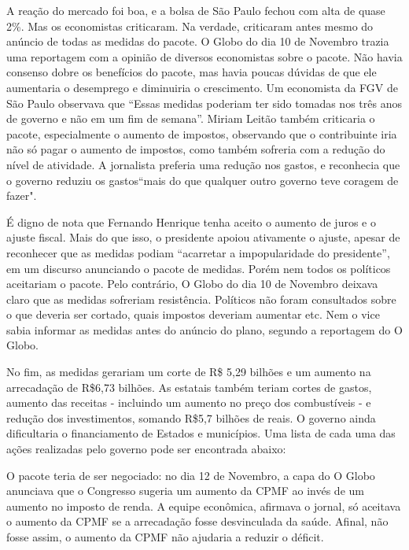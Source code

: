 \documentclass{article}
\begin{document}
A reação do mercado foi boa, e a bolsa de São Paulo fechou com alta de quase 2\%. Mas os economistas criticaram. Na verdade, criticaram antes mesmo do anúncio de todas as medidas do pacote. O Globo do dia 10 de Novembro trazia uma reportagem com a opinião de diversos economistas sobre o pacote. Não havia consenso dobre os benefícios do pacote, mas havia poucas dúvidas de que ele aumentaria o desemprego e diminuiria o crescimento. Um economista da FGV de São Paulo observava que ``Essas medidas poderiam ter sido tomadas nos três anos de governo e não em um fim de semana''. Miriam Leitão também criticaria o pacote, especialmente o aumento de impostos, observando que o contribuinte iria não só pagar o aumento de impostos, como também sofreria com a redução do nível de atividade. A jornalista preferia uma redução nos gastos, e reconhecia que o governo reduziu os gastos``mais do que qualquer outro governo teve coragem de fazer". 

É digno de nota que Fernando Henrique tenha aceito o aumento de juros e o ajuste fiscal. Mais do que isso, o presidente apoiou ativamente o ajuste, apesar de reconhecer que as medidas podiam ``acarretar a impopularidade do presidente'', em um discurso anunciando o pacote de medidas. Porém nem todos os políticos aceitariam o pacote. Pelo contrário, O Globo do dia 10 de Novembro deixava claro que as medidas sofreriam resistência. Políticos não foram consultados sobre o que deveria ser cortado, quais impostos deveriam aumentar etc. Nem o vice sabia informar as medidas antes do anúncio do plano, segundo a reportagem do O Globo. 

No fim, as medidas gerariam um corte de R\$ 5,29 bilhões e um aumento na arrecadação de R\$6,73 bilhões. As estatais também teriam cortes de gastos, aumento das receitas - incluindo um aumento no preço dos combustíveis - e redução dos investimentos, somando R\$5,7 bilhões de reais. O governo ainda dificultaria o financiamento de Estados e municípios. Uma lista de cada uma das ações realizadas pelo governo pode ser encontrada abaixo:


O pacote teria de ser negociado: no dia 12 de Novembro, a capa do O Globo anunciava que o Congresso sugeria um aumento da CPMF ao invés de um aumento no imposto de renda. A equipe econômica, afirmava o jornal, só aceitava o aumento da CPMF se a arrecadação fosse desvinculada da saúde. Afinal, não fosse assim, o aumento da CPMF não ajudaria a reduzir o déficit. 
\end{document}
